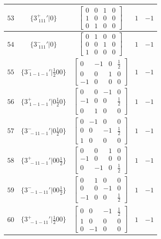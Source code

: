 \documentclass[fleqn,8pt]{jsarticle}
\begin{document}
\begin{longtable}{ccccc}
$ 53 $ & $ \{3^{+}_{\,\,111}{}'|0\} $ & $ \begin{bmatrix} 0 & 0 & 1 & 0 \\ 1 & 0 & 0 & 0 \\ 0 & 1 & 0 & 0 \end{bmatrix} $ & $ 1 $ & $ -1 $ \\ \hline
$ 54 $ & $ \{3^{-}_{\,\,111}{}'|0\} $ & $ \begin{bmatrix} 0 & 1 & 0 & 0 \\ 0 & 0 & 1 & 0 \\ 1 & 0 & 0 & 0 \end{bmatrix} $ & $ 1 $ & $ -1 $ \\ \hline
$ 55 $ & $ \{3^{-}_{\,\,1-1-1}{}'|\frac{1}{2} 0 0\} $ & $ \begin{bmatrix} 0 & -1 & 0 & \frac{1}{2} \\ 0 & 0 & 1 & 0 \\ -1 & 0 & 0 & 0 \end{bmatrix} $ & $ 1 $ & $ -1 $ \\ \hline
$ 56 $ & $ \{3^{+}_{\,\,1-1-1}{}'|0 \frac{1}{2} 0\} $ & $ \begin{bmatrix} 0 & 0 & -1 & 0 \\ -1 & 0 & 0 & \frac{1}{2} \\ 0 & 1 & 0 & 0 \end{bmatrix} $ & $ 1 $ & $ -1 $ \\ \hline
$ 57 $ & $ \{3^{-}_{\,\,-11-1}{}'|0 \frac{1}{2} 0\} $ & $ \begin{bmatrix} 0 & -1 & 0 & 0 \\ 0 & 0 & -1 & \frac{1}{2} \\ 1 & 0 & 0 & 0 \end{bmatrix} $ & $ 1 $ & $ -1 $ \\ \hline
$ 58 $ & $ \{3^{+}_{\,\,-11-1}{}'|0 0 \frac{1}{2}\} $ & $ \begin{bmatrix} 0 & 0 & 1 & 0 \\ -1 & 0 & 0 & 0 \\ 0 & -1 & 0 & \frac{1}{2} \end{bmatrix} $ & $ 1 $ & $ -1 $ \\ \hline
$ 59 $ & $ \{3^{-}_{\,\,-1-11}{}'|0 0 \frac{1}{2}\} $ & $ \begin{bmatrix} 0 & 1 & 0 & 0 \\ 0 & 0 & -1 & 0 \\ -1 & 0 & 0 & \frac{1}{2} \end{bmatrix} $ & $ 1 $ & $ -1 $ \\ \hline
$ 60 $ & $ \{3^{+}_{\,\,-1-11}{}'|\frac{1}{2} 0 0\} $ & $ \begin{bmatrix} 0 & 0 & -1 & \frac{1}{2} \\ 1 & 0 & 0 & 0 \\ 0 & -1 & 0 & 0 \end{bmatrix} $ & $ 1 $ & $ -1 $ \\ \hline

\end{longtable}
\end{document}
